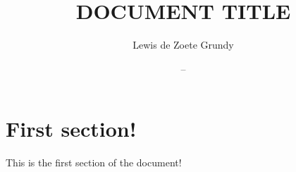 \documentclass{article}
\title{ DOCUMENT TITLE } %
\author{Lewis de Zoete Grundy}
\date{ -- } %
\begin{document}
\maketitle

\section{First section!}
This is the first section of the document!



\end{document}
